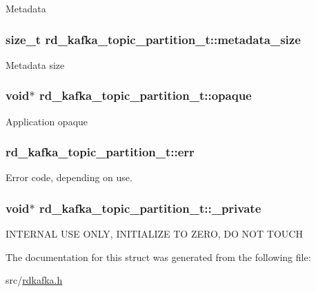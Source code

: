 \label{structrd__kafka__topic__partition__t_aa2a3d40daa1b0158186f3584886da5dc}
Metadata \hypertarget{structrd__kafka__topic__partition__t_a6f3387092692f325404bf3929247eede}{
\subsubsection[{metadata\_\-size}]{\setlength{\rightskip}{0pt plus 5cm}size\_\-t {\bf rd\_\-kafka\_\-topic\_\-partition\_\-t::metadata\_\-size}}}
\label{structrd__kafka__topic__partition__t_a6f3387092692f325404bf3929247eede}
Metadata size \hypertarget{structrd__kafka__topic__partition__t_a8ab6583124ba3e7382be5b2148672a4c}{
\subsubsection[{opaque}]{\setlength{\rightskip}{0pt plus 5cm}void$\ast$ {\bf rd\_\-kafka\_\-topic\_\-partition\_\-t::opaque}}}
\label{structrd__kafka__topic__partition__t_a8ab6583124ba3e7382be5b2148672a4c}
Application opaque \hypertarget{structrd__kafka__topic__partition__t_ab9370931853903657d7cabc9643d336e}{
\subsubsection[{err}]{ {\bf rd\_\-kafka\_\-topic\_\-partition\_\-t::err}}}
\label{structrd__kafka__topic__partition__t_ab9370931853903657d7cabc9643d336e}
Error code, depending on use. \hypertarget{structrd__kafka__topic__partition__t_ac41b2fea58ecc44fd8c99780ed9f6389}{
\subsubsection[{\_\-private}]{\setlength{\rightskip}{0pt plus 5cm}void$\ast$ {\bf rd\_\-kafka\_\-topic\_\-partition\_\-t::\_\-private}}}
\label{structrd__kafka__topic__partition__t_ac41b2fea58ecc44fd8c99780ed9f6389}
INTERNAL USE ONLY, INITIALIZE TO ZERO, DO NOT TOUCH 

The documentation for this struct was generated from the following file:\begin{DoxyCompactItemize}
\item 
src/\hyperlink{rdkafka_8h}{rdkafka.h}\end{DoxyCompactItemize}
